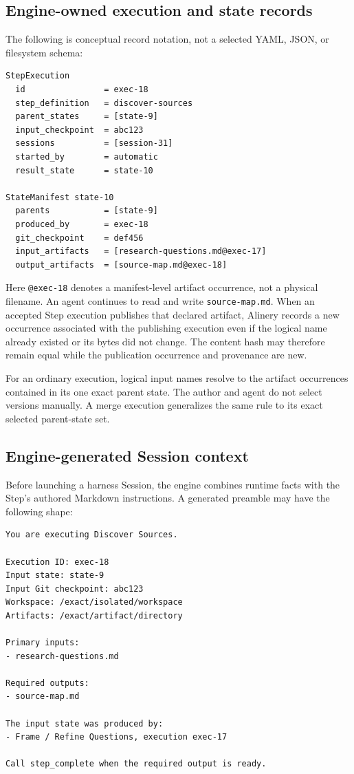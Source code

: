 \documentclass[11pt]{article}
\newcommand{\artifact}[1]{\texttt{#1}}
\begin{document}
\subsection{Engine-owned execution and state records}

The following is conceptual record notation, not a selected YAML, JSON, or
filesystem schema:

\begin{lstlisting}[style=playbook]
StepExecution
  id                = exec-18
  step_definition   = discover-sources
  parent_states     = [state-9]
  input_checkpoint  = abc123
  sessions          = [session-31]
  started_by        = automatic
  result_state      = state-10

StateManifest state-10
  parents           = [state-9]
  produced_by       = exec-18
  git_checkpoint    = def456
  input_artifacts   = [research-questions.md@exec-17]
  output_artifacts  = [source-map.md@exec-18]
\end{lstlisting}

Here \texttt{@exec-18} denotes a manifest-level artifact occurrence, not a
physical filename. An agent continues to read and write
\artifact{source-map.md}. When an accepted Step execution publishes that
declared artifact, Alinery records a new occurrence associated with the
publishing execution even if the logical name already existed or its bytes did
not change. The content hash may therefore remain equal while the publication
occurrence and provenance are new.

For an ordinary execution, logical input names resolve to the artifact
occurrences contained in its one exact parent state. The author and agent do not
select versions manually. A merge execution generalizes the same rule to its
exact selected parent-state set.

\clearpage
\thispagestyle{fancy}
\subsection{Engine-generated Session context}

Before launching a harness Session, the engine combines runtime facts with the
Step's authored Markdown instructions. A generated preamble may have the
following shape:

\begin{lstlisting}[style=playbook]
You are executing Discover Sources.

Execution ID: exec-18
Input state: state-9
Input Git checkpoint: abc123
Workspace: /exact/isolated/workspace
Artifacts: /exact/artifact/directory

Primary inputs:
- research-questions.md

Required outputs:
- source-map.md

The input state was produced by:
- Frame / Refine Questions, execution exec-17

Call step_complete when the required output is ready.
\end{lstlisting}
\end{document}
